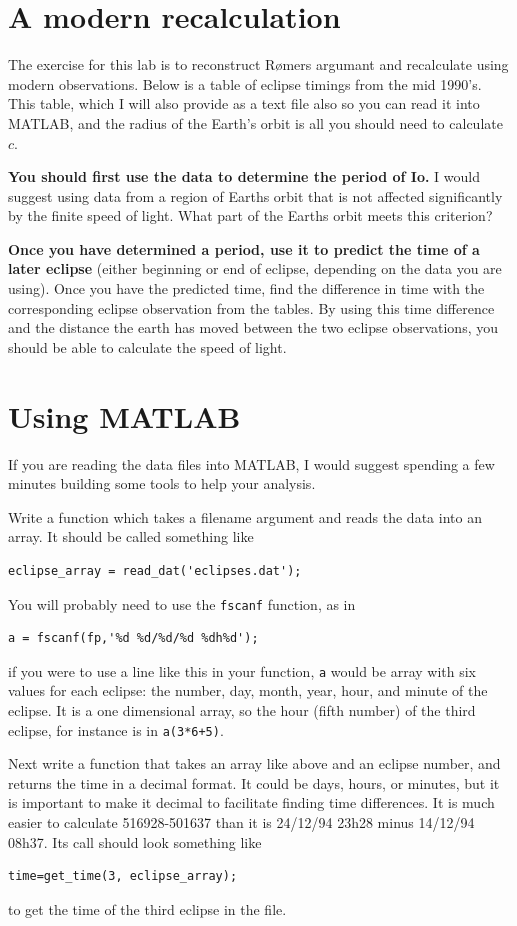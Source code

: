 \documentclass{tufte-handout}
\begin{document}
\section{A modern recalculation}

The exercise for this lab is to reconstruct R{\o}mers argumant and recalculate using modern observations.  Below is a table of eclipse timings from the mid 1990's.  This table, which I will also provide as a text file also so you can read it into {\sc MATLAB}, and the radius of the Earth's orbit is all you should need to calculate $c$.

{\bf You should first use the data to determine the period of Io.}  I would suggest using data from a region of Earths orbit that is not affected significantly by the finite speed of light.  What part of the Earths orbit meets this criterion?

{\bf Once you have determined a period, use it to predict the time of a later eclipse} (either beginning or end of eclipse, depending on the data you are using).  Once you have the predicted time, find the difference in time with the corresponding eclipse observation from the tables.  By using this time difference and the distance the earth has moved between the two eclipse observations, you should be able to calculate the speed of light.

\section{Using MATLAB}

If you are reading the data files into {\sc MATLAB}, I would suggest spending a few minutes building some tools to help your analysis. 

Write a function which takes a filename argument and reads the data into an array.   It should be called something like
\begin{verbatim}
eclipse_array = read_dat('eclipses.dat');
\end{verbatim}
You will probably need to use the {\tt fscanf} function, as in
\begin{verbatim}
a = fscanf(fp,'%d %d/%d/%d %dh%d');
\end{verbatim}
if you were to use a line like this in your function, {\tt a} would be array with six values for each eclipse: the number, day, month, year, hour, and minute of the eclipse.  It is a one dimensional array, so the hour (fifth number) of the third eclipse, for instance is in {\tt a(3*6+5)}.

Next write a function that takes an array like above and an eclipse number, and returns the time in a decimal format.  It could be days, hours, or minutes, but it is important to make it decimal to facilitate finding time differences.  It is much easier to calculate  516928-501637  than it is 24/12/94 23h28 minus 14/12/94 08h37.  Its call should look something like
\begin{verbatim}
time=get_time(3, eclipse_array);
\end{verbatim}
to get the time of the third eclipse in the file.
\end{document}
